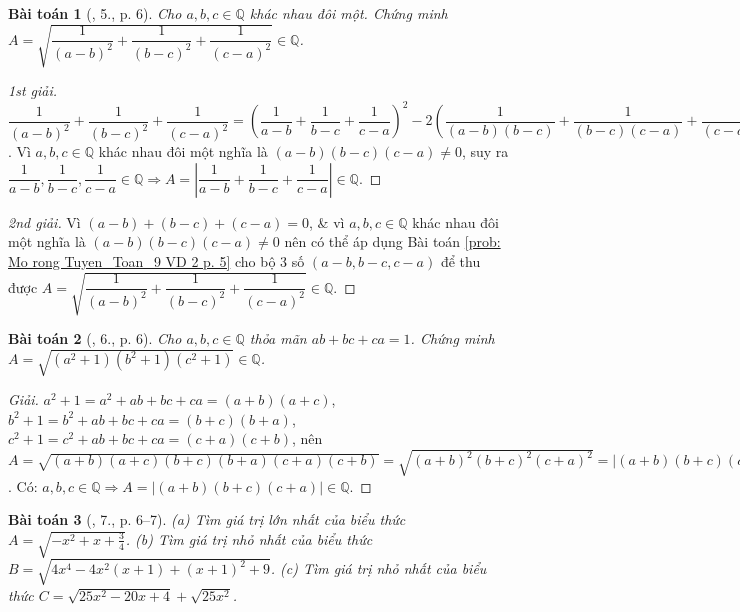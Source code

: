 \documentclass{article}
\newtheorem{baitoan}{Bài toán}
\begin{document}
\begin{baitoan}[\cite{Tuyen_Toan_9}, 5., p. 6]
	Cho $a,b,c\in\mathbb{Q}$ khác nhau đôi một. Chứng minh $A = \sqrt{\dfrac{1}{(a - b)^2} + \dfrac{1}{(b - c)^2} + \dfrac{1}{(c - a)^2}}\in\mathbb{Q}$.
\end{baitoan}

\begin{proof}[1st giải]
	$\dfrac{1}{(a - b)^2} + \dfrac{1}{(b - c)^2} + \dfrac{1}{(c - a)^2} = \left(\dfrac{1}{a - b} + \dfrac{1}{b - c} + \dfrac{1}{c - a}\right)^2 - 2\left(\dfrac{1}{(a - b)(b - c)} + \dfrac{1}{(b - c)(c - a)} + \dfrac{1}{(c - a)(a - b)}\right) = \left(\dfrac{1}{a - b} + \dfrac{1}{b - c} + \dfrac{1}{c - a}\right)^2 - \dfrac{2(c - a + a - b + b - c)}{(a - b)(b - c)(c - a)} = \left(\dfrac{1}{a - b} + \dfrac{1}{b - c} + \dfrac{1}{c - a}\right)^2\Rightarrow A = \left|\dfrac{1}{a - b} + \dfrac{1}{b - c} + \dfrac{1}{c - a}\right|$. Vì $a,b,c\in\mathbb{Q}$ khác nhau đôi một nghĩa là $(a - b)(b - c)(c - a)\ne0$, suy ra $\dfrac{1}{a - b},\dfrac{1}{b - c},\dfrac{1}{c - a}\in\mathbb{Q}\Rightarrow A = \left|\dfrac{1}{a - b} + \dfrac{1}{b - c} + \dfrac{1}{c - a}\right|\in\mathbb{Q}$.
\end{proof}

\begin{proof}[2nd giải]
	Vì $(a - b) + (b - c) + (c - a) = 0$, \& vì $a,b,c\in\mathbb{Q}$ khác nhau đôi một nghĩa là $(a - b)(b - c)(c - a)\ne0$ nên có thể áp dụng Bài toán \ref{prob: Mo rong Tuyen_Toan_9 VD 2 p. 5} cho bộ 3 số $(a - b,b - c,c - a)$ để thu được $A = \sqrt{\dfrac{1}{(a - b)^2} + \dfrac{1}{(b - c)^2} + \dfrac{1}{(c - a)^2}}\in\mathbb{Q}$.
\end{proof}

\begin{baitoan}[\cite{Tuyen_Toan_9}, 6., p. 6]
	Cho $a,b,c\in\mathbb{Q}$ thỏa mãn $ab + bc + ca = 1$. Chứng minh $A = \sqrt{(a^2 + 1)(b^2 + 1)(c^2 + 1)}\in\mathbb{Q}$.
\end{baitoan}

\begin{proof}[Giải]
	$a^2 + 1 = a^2 + ab + bc + ca = (a + b)(a + c)$, $b^2 + 1 = b^2 + ab + bc + ca = (b + c)(b + a)$, $c^2 + 1 = c^2 + ab + bc + ca = (c + a)(c + b)$, nên $A = \sqrt{(a + b)(a + c)(b + c)(b + a)(c + a)(c + b)} = \sqrt{(a + b)^2(b + c)^2(c + a)^2} = |(a + b)(b + c)(c + a)|$. Có: $a,b,c\in\mathbb{Q}\Rightarrow A = |(a + b)(b + c)(c + a)|\in\mathbb{Q}$.
\end{proof}

\begin{baitoan}[\cite{Tuyen_Toan_9}, 7., p. 6--7]
	(a) Tìm giá trị lớn nhất của biểu thức $A = \sqrt{-x^2 + x + \frac{3}{4}}$. (b) Tìm giá trị nhỏ nhất của biểu thức $B = \sqrt{4x^4 - 4x^2(x + 1) + (x + 1)^2 + 9}$. (c) Tìm giá trị nhỏ nhất của biểu thức $C = \sqrt{25x^2 - 20x + 4} + \sqrt{25x^2}$.
\end{baitoan}
\end{document}
